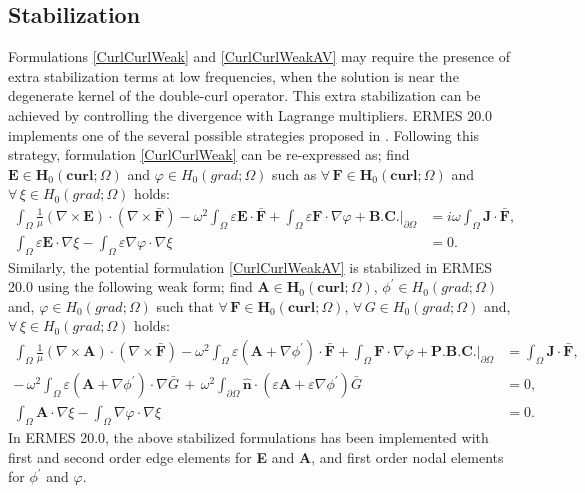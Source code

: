 \subsection{Stabilization}\label{EdgeDoubleCurlStab}

Formulations \ref{CurlCurlWeak} and \ref{CurlCurlWeakAV} may require the presence of extra stabilization terms at low frequencies, when the solution is near the degenerate kernel of the double-curl operator. This extra stabilization can be achieved by controlling the divergence with Lagrange multipliers. ERMES 20.0 implements one of the several possible strategies proposed in \cite{Monk}. Following this strategy, formulation \ref{CurlCurlWeak} can be re-expressed as; find $\mathbf{E} \in \mathbf{H}_{0}(\mathbf{curl};\Omega)$ and $\varphi \in H_{0}(grad;\Omega)$ such as $\forall\,\mathbf{F} \in \mathbf{H}_{0}(\mathbf{curl};\Omega)$ and $\forall\,\xi \in H_{0}(grad;\Omega)$ holds:
\begin{equation}\label{CurlCurlWeakS}
    \begin{aligned}
	    \int_{\Omega}\frac{1}{\mu}(\nabla\times\mathbf{E})\cdot(\nabla\times\mathbf{\bar{F}}) - \omega^{2}\int_{\Omega}\varepsilon\mathbf{E}\cdot\mathbf{\bar{F}} + \int_{\Omega}\varepsilon\mathbf{F}\cdot\nabla\varphi + \textbf{B.C.}|_{\partial\Omega} &= i\omega\int_{\Omega}\mathbf{J}\cdot\mathbf{\bar{F}},
	    \\
	    \int_{\Omega}\varepsilon\mathbf{E}\cdot\nabla\xi - \int_{\Omega}\varepsilon\nabla\varphi\cdot\nabla\xi &= 0.
    \end{aligned}
\end{equation}
Similarly, the potential formulation \ref{CurlCurlWeakAV} is stabilized in ERMES 20.0 using the following weak form; find $\mathbf{A} \in \mathbf{H}_{0}(\mathbf{curl};\Omega)$, $\phi^{'} \in H_{0}(grad;\Omega)$ and, $\varphi \in H_{0}(grad;\Omega)$ such
that $\forall\,\mathbf{F} \in \mathbf{H}_{0}(\mathbf{curl};\Omega)$, $\forall\,G \in H_{0}(grad;\Omega)$ and, $\forall\,\xi \in H_{0}(grad;\Omega)$ holds:
\begin{equation}\label{CurlCurlWeakAVS2}
	\nonumber
	\begin{aligned}
	    \int_{\Omega}\frac{1}{\mu}(\nabla\times\mathbf{A})\cdot(\nabla\times\mathbf{\bar{F}}) - \omega^{2}\int_{\Omega}\varepsilon\left(\mathbf{A} + \nabla\phi^{'}\right)\cdot\mathbf{\bar{F}} + \int_{\Omega}\mathbf{F}\cdot\nabla\varphi + \textbf{P.B.C.}|_{\partial\Omega} &= \int_{\Omega}\mathbf{J}\cdot\mathbf{\bar{F}},
        \\
        -\,\omega^{2}\int_{\Omega}\varepsilon\left(\mathbf{A} + \nabla\phi^{'}\right)\cdot\nabla\bar{G}\, + \,\omega^{2}\int_{\partial\Omega}\mathbf{\hat{n}}\cdot\left(\varepsilon\mathbf{A} + \varepsilon\nabla\phi^{'}\right)\bar{G}\, &= 0,	
        \\
        \int_{\Omega}\mathbf{A}\cdot\nabla\xi - \int_{\Omega}\nabla\varphi\cdot\nabla\xi &= 0.	
	\end{aligned}
\end{equation}
In ERMES 20.0, the above stabilized formulations has been implemented with first and second order edge elements for \textbf{E} and \textbf{A}, and first order nodal elements for $\phi^{'}$ and $\varphi$.

